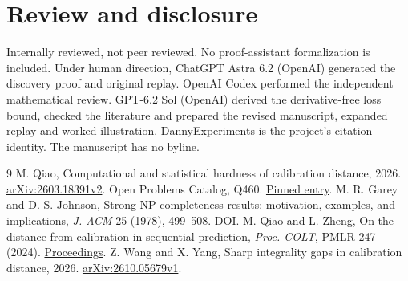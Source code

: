 \documentclass[11pt,a4paper]{amsart}
\begin{document}
\section*{Review and disclosure}
Internally reviewed, not peer reviewed. No proof-assistant
formalization is included. Under human direction, ChatGPT Astra 6.2
(OpenAI) generated the discovery proof and original replay.
OpenAI Codex performed the independent mathematical review.
GPT-6.2 Sol (OpenAI) derived the derivative-free loss bound,
checked the literature and prepared the revised manuscript,
expanded replay and worked illustration. DannyExperiments is
the project's citation identity. The manuscript has no byline.

\begin{thebibliography}{9}
 M. Qiao, Computational and statistical hardness of
calibration distance, 2026.
\href{https://arxiv.org/abs/2603.18391v2}{arXiv:2603.18391v2}.
 Open Problems Catalog, Q460.
\href{https://github.com/10m-u/open-problems-catalog/blob/ca8d4d44ba3db527f19f28928c240168f545ecfe/problems/computer_science_ai/classical-statistical-machine-learning.md\#q460}{Pinned entry}.
 M. R. Garey and D. S. Johnson, Strong NP-completeness
results: motivation, examples, and implications,
\emph{J. ACM} 25 (1978), 499--508.
\href{https://doi.org/10.1145/322077.322090}{DOI}.
 M. Qiao and L. Zheng, On the distance from calibration in
sequential prediction, \emph{Proc. COLT}, PMLR 247 (2024).
\href{https://proceedings.mlr.press/v247/qiao24a.html}{Proceedings}.
 Z. Wang and X. Yang, Sharp integrality gaps in calibration
distance, 2026.
\href{https://arxiv.org/abs/2610.05679v1}{arXiv:2610.05679v1}.
\end{thebibliography}
\end{document}
